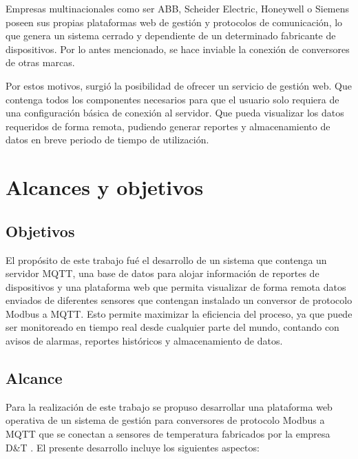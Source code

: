Empresas multinacionales como ser ABB, Scheider Electric, Honeywell o Siemens poseen sus propias plataformas web de gestión y protocolos de comunicación, lo que genera un sistema cerrado y dependiente de un determinado fabricante de dispositivos. Por lo antes mencionado, se hace inviable la conexión de conversores de otras marcas. 

Por estos motivos, surgió la posibilidad de ofrecer un servicio de gestión web. Que contenga todos los componentes necesarios para que el usuario solo requiera de una configuración básica de conexión al servidor.  Que pueda visualizar los datos requeridos de forma remota, pudiendo generar reportes y almacenamiento de datos en breve periodo de tiempo de utilización. 



\section{Alcances y objetivos}

\subsection{Objetivos}

El propósito de este trabajo fué el desarrollo de un sistema que contenga un servidor MQTT, una base de datos para alojar información de reportes de dispositivos y una plataforma web que permita visualizar de forma remota datos enviados de diferentes sensores que contengan instalado un conversor de protocolo Modbus a MQTT.  Esto permite maximizar la eficiencia del proceso, ya que puede ser monitoreado en tiempo real desde cualquier parte del mundo, contando con avisos de alarmas, reportes históricos y almacenamiento de datos. 

\subsection{Alcance}

Para la realización de este trabajo se propuso desarrollar una plataforma web operativa de un sistema de gestión para conversores de protocolo Modbus a MQTT que se conectan a sensores de temperatura fabricados por la empresa D\&T \citep{WEBSITE:8}.  El presente desarrollo incluye los siguientes aspectos:


